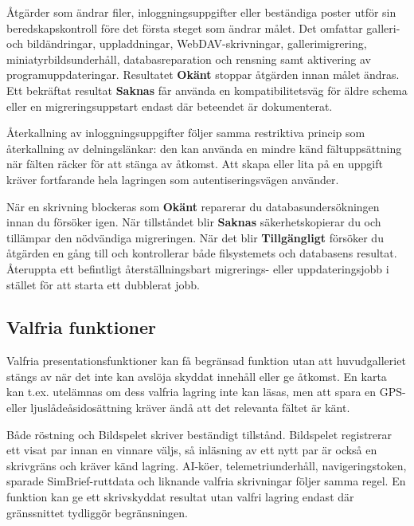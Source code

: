 \documentclass[11pt,a4paper]{article}
\newcommand{\ui}[1]{\textbf{#1}}
\begin{document}
Åtgärder som ändrar filer, inloggningsuppgifter eller beständiga poster utför
sin beredskapskontroll före det första steget som ändrar målet. Det omfattar
galleri- och bildändringar, uppladdningar, WebDAV-skrivningar, gallerimigrering,
miniatyrbildsunderhåll, databasreparation och rensning samt aktivering av
programuppdateringar. Resultatet \ui{Okänt} stoppar åtgärden innan målet ändras.
Ett bekräftat resultat \ui{Saknas} får använda en kompatibilitetsväg för äldre
schema eller en migreringsuppstart endast där beteendet är dokumenterat.

Återkallning av inloggningsuppgifter följer samma restriktiva princip som
återkallning av delningslänkar: den kan använda en mindre känd fältuppsättning
när fälten räcker för att stänga av åtkomst. Att skapa eller lita på en uppgift
kräver fortfarande hela lagringen som autentiseringsvägen använder.

När en skrivning blockeras som \ui{Okänt} reparerar du databasundersökningen
innan du försöker igen. När tillståndet blir \ui{Saknas} säkerhetskopierar du
och tillämpar den nödvändiga migreringen. När det blir \ui{Tillgängligt}
försöker du åtgärden en gång till och kontrollerar både filsystemets och
databasens resultat. Återuppta ett befintligt återställningsbart migrerings-
eller uppdateringsjobb i stället för att starta ett dubblerat jobb.

\subsection{Valfria funktioner}

Valfria presentationsfunktioner kan få begränsad funktion utan att
huvudgalleriet stängs av när det inte kan avslöja skyddat innehåll eller ge
åtkomst. En karta kan t.ex. utelämnas om dess valfria lagring inte kan läsas,
men att spara en GPS- eller ljuslådeåsidosättning kräver ändå att det relevanta
fältet är känt.

Både röstning och Bildspelet skriver beständigt tillstånd. Bildspelet
registrerar ett visat par innan en vinnare väljs, så inläsning av ett nytt par
är också en skrivgräns och kräver känd lagring. AI-köer, telemetriunderhåll,
navigeringstoken, sparade SimBrief-ruttdata och liknande valfria skrivningar
följer samma regel. En funktion kan ge ett skrivskyddat resultat utan valfri
lagring endast där gränssnittet tydliggör begränsningen.
\end{document}
